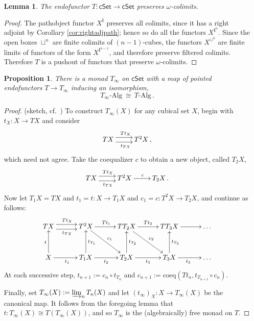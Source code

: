 \documentclass[12pt]{article}
\newcommand{\cSet}{\ensuremath{\mathsf{cSet}}}
\newcommand{\Tinf}{\ensuremath{T_\infty}}
\newcommand{\I}{\ensuremath{\mathrm{I}}}
\newtheorem{proposition}[theorem]{Proposition}
\newtheorem{lemma}[theorem]{Lemma}
\theoremstyle{remark}
\theoremstyle{definition}
\begin{document}
\begin{lemma}\label{lem:compact}
The endofunctor $T : \cSet \to \cSet$ preserves $\omega$-colimits.
\end{lemma}
\begin{proof}
The pathobject functor $X^\I$ preserves all colimits, since it has a right adjoint by Corollary \ref{cor:rightadjpath}; hence so do all the functors $X^{\I^n}$.  Since the open boxes $\sqcup^{n}$ are finite colimits of $(n-1)$-cubes, the functors $X^{\sqcup^{n}}$ are finite limits of functors of the form $X^{\I^{n-1}}$, and therefore preserve filtered colimits.  Therefore $T$ is a pushout of functors that preserve $\omega$-colimits.
\end{proof}

\begin{proposition}
There is a monad $\Tinf$ on $\cSet$ with a map of pointed endofunctors $T\to T_\infty$ inducing an isomorphism,
\[
T_\infty\mbox{-}\mathrm{Alg}\ \cong\ T\mbox{-}\mathrm{Alg}\,.
\]  
\end{proposition}

\begin{proof}(sketch, cf.\ \cite{Garner})
To construct $\Tinf(X)$ for any cubical set $X$,  begin with $t_X :X\to TX$ and  consider 
\[
\xymatrix{
TX  \ar@<.8ex>[r]^{Tt_X}  \ar@<-.8ex>[r]_{t_{TX}} & T^2X\,,
}
\]
which need not agree.  Take the coequalizer $c$ to obtain a new object, called $T_2X$,
\[
\xymatrix{
TX  \ar@<.8ex>[r]^{Tt_X}  \ar@<-.8ex>[r]_{t_{TX}} & T^2X \ar[r]^c & T_2X\,.
}
\]
Now let $T_1X = TX$ and $t_1 = t : X\to T_1X$ and $c_1 = c : T^2X\to T_2X$, and continue as follows:
\[
\xymatrix@=3em{
TX  \ar@<.8ex>[r]^{Tt_X}  \ar@<-.8ex>[r]_{t_{TX}} & T^2X \ar[rd]^{c_1} \ar[r]^{Tt_1} & TT_2X \ar[rd]^{c_2} \ar[r]^{Tt_2} & TT_3X \ar[r] & \dots\\
X \ar[u]^{t} \ar[r]_{t_1} & T_1X \ar[u]_{t_{T_1}} \ar[r]_{t_2} & T_2X \ar[u]_{t_{T_2}} \ar[r]_{t_3} & T_3X \ar[u]_{t_{T_3}} \ar[r]_{t_3} & \dots
}
\]
At each successive step, $t_{n+1} := c_n\circ t_{T_n}$ and $c_{n+1} := \mathrm{coeq}(Tt_n, t_{T_{n+1}}\circ c_n)$.

Finally, set $\Tinf(X) := \varinjlim_{n}T_n(X)$ and let $(t_\infty)_X: X\to \Tinf(X)$ be the canonical map.  It follows from the foregoing lemma that $t : \Tinf(X) \cong T(\Tinf(X))$, and so $\Tinf$ is the (algebraically) free monad on $T$.
\end{proof}
\end{document}
